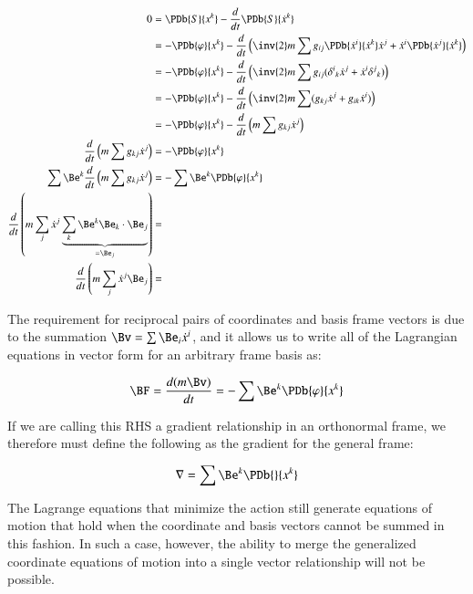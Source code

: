 \begin{align*}
0
&= \PDb{S}{x^k} - \frac{d}{dt}\PDb{S}{\dot{x}^k} \\
&= -\PDb{\varphi}{x^k} - \frac{d}{dt} \left( \inv{2} m \sum g_{ij} \PDb{\dot{x}^i}{\dot{x}^k} \dot{x}^j + \dot{x}^i \PDb{\dot{x}^j}{\dot{x}^k} \right) \\
&= -\PDb{\varphi}{x^k} - \frac{d}{dt} \left( \inv{2} m \sum g_{ij} ({\delta^i}_k \dot{x}^j + \dot{x}^i {\delta^j}_k) \right) \\
&= -\PDb{\varphi}{x^k} - \frac{d}{dt} \left( \inv{2} m \sum (g_{kj} \dot{x}^j + g_{ik}\dot{x}^i) \right) \\
&= -\PDb{\varphi}{x^k} - \frac{d}{dt} \left( m \sum g_{kj} \dot{x}^j \right) \\
\frac{d}{dt} \left( m \sum g_{kj} \dot{x}^j \right) &= -\PDb{\varphi}{x^k} \\
\sum \Be^k \frac{d}{dt} \left( m \sum g_{kj} \dot{x}^j \right) &= - \sum \Be^k \PDb{\varphi}{x^k} \\
\frac{d}{dt} \left( m \sum_j \dot{x}^j \underbrace{\sum_k \Be^k \Be_k \cdot \Be_j}_{=\Be_j} \right) &= \\
\frac{d}{dt} \left( m \sum_j \dot{x}^j \Be_j \right) &= \\
\end{align*}

The requirement for reciprocal pairs of coordinates and basis frame vectors is due to the
summation $\Bv = \sum \Be_i \dot{x}^i$, and it allows us to write all of the Lagrangian equations
in vector form for an arbitrary frame basis as:

\begin{equation}
\BF = \frac{d (m \Bv)}{dt} = - \sum \Be^k \PDb{\varphi}{x^k}
\end{equation}

If we are calling this RHS a gradient relationship in an orthonormal frame, we therefore must define
the following as the gradient for the general frame:

\begin{equation}\label{eqn:newtonLaG:gradient}
\grad = \sum \Be^k \PDb{}{x^k}
\end{equation}

The Lagrange equations that minimize the action still generate equations of
motion that hold when the coordinate and basis vectors cannot be summed in this fashion.
In such a case, however, the ability to merge the generalized coordinate equations of motion into a single
vector relationship will not be possible.

